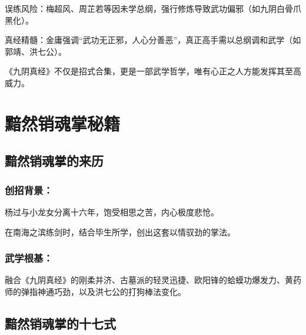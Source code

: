 \documentclass[doctor, vlined]{DissertUESTC}
\begin{document}
	误练风险：梅超风、周芷若等因未学总纲，强行修炼导致武功偏邪（如九阴白骨爪黑化）。

	真经精髓：金庸强调“武功无正邪，人心分善恶”，真正高手需以总纲调和武学（如郭靖、洪七公）。

	《九阴真经》不仅是招式合集，更是一部武学哲学，唯有心正之人方能发挥其至高威力。
	
	\chapter{黯然销魂掌秘籍}
	
	\section{黯然销魂掌的来历}
	
	\subsection{创招背景：}

	杨过与小龙女分离十六年，饱受相思之苦，内心极度悲怆。

	在南海之滨练剑时，结合毕生所学，创出这套以情驭劲的掌法。

	\subsection{武学根基：}

	融合《九阴真经》的刚柔并济、古墓派的轻灵迅捷、欧阳锋的蛤蟆功爆发力、黄药师的弹指神通巧劲，以及洪七公的打狗棒法变化。

	\section{黯然销魂掌的十七式}
\end{document}
